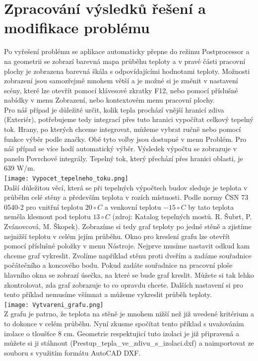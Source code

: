 \documentclass[a4paper, oneside]{article}
\begin{document}
\section{Zpracování výsledků řešení a modifikace problému}
\indent Po vyřešení problému se aplikace automaticky přepne do režimu Postprocessor a na geometrii se zobrazí barevná mapa průběhu teploty a v pravé části pracovní plochy je zobrazena barevná škála s odpovídajícími hodnotami teploty. Možnosti zobrazení jsou samozřejmě mnohem větší a je možné si je změnit v nastavení scény, které lze otevřít pomocí klávesové zkratky F12, nebo pomocí příslušné nabídky v menu Zobrazení, nebo kontextovém menu pracovní plochy.\\
\indent Pro náš případ je důležité určit, kolik tepla prochází vnější hranicí zdiva (Exteriér), potřebujeme tedy integrací přes tuto hranici vypočítat celkový tepelný tok. Hrany, po kterých chceme integrovat, můžeme vybrat ručně nebo pomocí funkce výběr podle značky. Obě tyto volby jsou dostupné v menu Problém. Pro náš případ se více hodí automatický výběr. Výsledek výpočtu se zobrazuje v panelu Povrchové integrály. Tepelný tok, který přechází přes hranici oblasti, je 639 W/m.\\
\texttt{[image: Vypocet\_tepelneho\_toku.png]}\\
\indent Další důležitou věcí, která se při tepelných výpočtech budov sleduje je teplota v průběhu celé stěny a především teplota v rozích místnosti. Podle normy ČSN 73 0540-2 pro vnitřní teplotu $20 \circ C$ a venkovní teplotu $-15 \circ C$ by tato teplota neměla klesnout pod teplotu $13 \circ C$ (zdroj: Katalog tepelných mostů. R. Šubrt, P. Zvánovcová, M. Škopek). Zobrazíme si tedy graf teploty po jedné stěně a zjistíme nejnižší teplotu v celém jejím průběhu. Okno pro kreslení grafu lze otevřít pomocí příslušné položky v menu Nástroje. Nejprve musíme nastavit odkud kam chceme graf vykreslit. Zvolíme například stěnu proti dveřím a zadáme souřadnice počátečního a koncového bodu. Pokud zadáte souřadnice na pracovní ploše hlavního okna se zobrazí úsečka, na které se bude graf kreslit. Můžete si tak lehko zkontrolovat, zda graf zobrazuje to co opravdu chcete. Dalších nastavení si pro tento příklad nemusíme všímnat a můžeme vykreslit průběh teploty.\\
\texttt{[image: Vytvareni\_grafu.png]}\\
\indent Z grafu je patrno, že teplota na stěně je mnohem nižší než již uvedené kritérium a to dokonce v celém průběhu. Nyní zkusme spočítat tento příklad s uvažováním izolace o tloušťce 8 cm. Geometrie respektujicí tuto izolaci je již připravená a můžete si ji stáhnout (Prestup\_tepla\_ve\_zdivu\_s\_izolaci.dxf) a naimportovat ze souboru s využitím formátu AutoCAD DXF.\\
\end{document}

